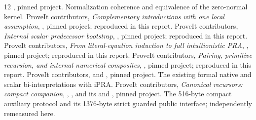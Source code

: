 \begin{thebibliography}{12}
, pinned project.
Normalization coherence and equivalence of the zero-normal kernel.
ProveIt contributors, \emph{Complementary introductions with one
local assumption},
,
pinned project; reproduced in this report.
ProveIt contributors, \emph{Internal scalar predecessor bootstrap},
,
pinned project; reproduced in this report.
ProveIt contributors, \emph{From literal-equation induction to full
intuitionistic PRA},
,
pinned project; reproduced in this report.
ProveIt contributors, \emph{Pairing, primitive recursion, and internal
numerical composites},
,
pinned project; reproduced in this report.
ProveIt contributors, 
and , pinned project.
The existing formal native and scalar bi-interpretations with iPRA.
ProveIt contributors, \emph{Canonical recursors: compact companion},
,
, and its
 and
, pinned project.
The 516-byte compact auxiliary protocol and its 1376-byte
strict guarded public interface; independently remeasured here.
\end{thebibliography}

